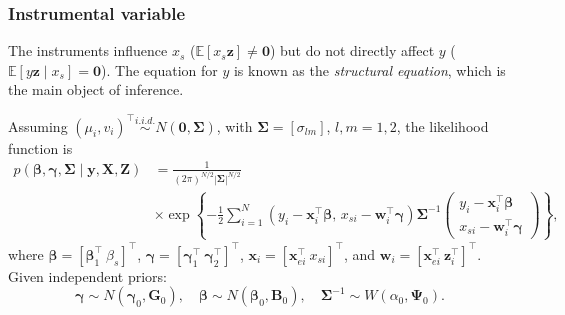 \documentclass[12pt, compress]{beamer}
\begin{document}
\begin{frame}
	\frametitle{Instrumental variable}
The instruments influence \(x_s\) (\(\mathbb{E}[x_s \bm{z}] \neq \bm{0}\)) but do not directly affect \(y\) (\(\mathbb{E}[y \bm{z} \mid x_s] = \bm{0}\)). The equation for \(y\) is known as the \textit{structural equation}, which is the main object of inference.

Assuming $(\mu_i, v_i)^{\top} \stackrel{i.i.d.}{\sim} N(\bm{0}, \bm{\Sigma})$, with $\bm{\Sigma} = [\sigma_{lm}]$, $l,m = 1,2$, the likelihood function is
{\scriptsize{
\begin{align*}
	p(\bm{\beta}, \bm{\gamma}, \bm{\Sigma} \mid \bm{y}, \bm{X}, \bm{Z}) 
	&= \frac{1}{(2\pi)^{N/2} |\bm{\Sigma}|^{N/2}}\\
	&\times
	\exp\left\{
	-\frac{1}{2} \sum_{i=1}^N 
	(y_i - \bm{x}_i^{\top}\bm{\beta},\, x_{si} - \bm{w}_i^{\top}\bm{\gamma})\bm{\Sigma}^{-1}
	\begin{pmatrix}
		y_i - \bm{x}_i^{\top}\bm{\beta} \\
		x_{si} - \bm{w}_i^{\top}\bm{\gamma}
	\end{pmatrix}
	\right\},
\end{align*}
}}
where $\bm{\beta} = [\bm{\beta}_1^{\top} \ \beta_s]^{\top}$, $\bm{\gamma} = [\bm{\gamma}_1^{\top} \ \bm{\gamma}_2^{\top}]^{\top}$, $\bm{x}_i = [\bm{x}_{ei}^{\top} \ x_{si}]^{\top}$, and $\bm{w}_i = [\bm{x}_{ei}^{\top} \ \bm{z}_{i}^{\top}]^{\top}$.\\
Given independent priors:
\[
\bm{\gamma} \sim N(\bm{\gamma}_0, \bm{G}_0), 
\quad 
\bm{\beta} \sim N(\bm{\beta}_0, \bm{B}_0), 
\quad 
\bm{\Sigma}^{-1} \sim W(\alpha_0, \bm{\Psi}_0).
\]
\end{frame}
\end{document}
